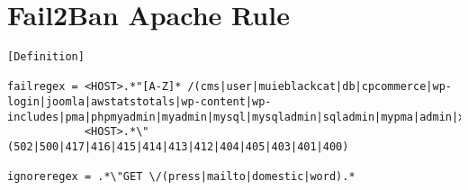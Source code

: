 \chapter{Fail2Ban Apache Rule}
\label{app:fail2banRule}

\begin{lstlisting}
[Definition]

failregex = <HOST>.*"[A-Z]* /(cms|user|muieblackcat|db|cpcommerce|wp-login|joomla|awstatstotals|wp-content|wp-includes|pma|phpmyadmin|myadmin|mysql|mysqladmin|sqladmin|mypma|admin|xampp|mysqldb|pmadb|phpmyadmin1|phpmyadmin2).*"
            <HOST>.*\" (502|500|417|416|415|414|413|412|404|405|403|401|400)

ignoreregex = .*\"GET \/(press|mailto|domestic|word).*

\end{lstlisting}